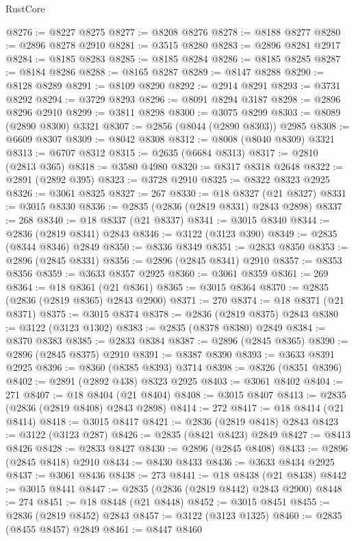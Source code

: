 \begin{lexlean}{RustCore}
\begin{coremodule}
@8276 := @8227 @8275
@8277 := @8208 @8276
@8278 := @8188 @8277
@8280 := @2896 @8278 @2910
@8281 := @3515 @8280
@8283 := @2896 @8281 @2917
@8284 := @8185 @8283
@8285 := @8185 @8284
@8286 := @8185 @8285
@8287 := @8184 @8286
@8288 := @8165 @8287
@8289 := @8147 @8288
@8290 := @8128 @8289
@8291 := @8109 @8290
@8292 := @2914 @8291
@8293 := @3731 @8292
@8294 := @3729 @8293
@8296 := @8091 @8294 @3187
@8298 := @2896 @8296 @2910
@8299 := @3811 @8298
@8300 := @3075 @8299
@8303 := @8089 (@2890 @8300) @3321
@8307 := @2856 (@8044 (@2890 @8303)) @2985
@8308 := @6609 @8307
@8309 := @8042 @8308
@8312 := @8008 (@8040 @8309) @3321
@8313 := @6707 @8312
@8315 := @2635 (@6684 @8313)
@8317 := @2810 (@2813 @365)
@8318 := @3580 @4980
@8320 := @8317 @8318 @2648
@8322 := @2891 (@2892 @395)
@8323 := @3728 @2910
@8325 := @8322 @8323 @2925
@8326 := @3061 @8325
@8327 := 267
@8330 := @18 @8327 (@21 @8327)
@8331 := @3015 @8330
@8336 := @2835 (@2836 (@2819 @8331) @2843 @2898)
@8337 := 268
@8340 := @18 @8337 (@21 @8337)
@8341 := @3015 @8340
@8344 := @2836 (@2819 @8341) @2843
@8346 := @3122 (@3123 @390)
@8349 := @2835 (@8344 @8346) @2849
@8350 := @8336 @8349
@8351 := @2833 @8350
@8353 := @2896 (@2845 @8331)
@8356 := @2896 (@2845 @8341) @2910
@8357 := @8353 @8356
@8359 := @3633 @8357 @2925
@8360 := @3061 @8359
@8361 := 269
@8364 := @18 @8361 (@21 @8361)
@8365 := @3015 @8364
@8370 := @2835 (@2836 (@2819 @8365) @2843 @2900)
@8371 := 270
@8374 := @18 @8371 (@21 @8371)
@8375 := @3015 @8374
@8378 := @2836 (@2819 @8375) @2843
@8380 := @3122 (@3123 @1302)
@8383 := @2835 (@8378 @8380) @2849
@8384 := @8370 @8383
@8385 := @2833 @8384
@8387 := @2896 (@2845 @8365)
@8390 := @2896 (@2845 @8375) @2910
@8391 := @8387 @8390
@8393 := @3633 @8391 @2925
@8396 := @8360 (@8385 @8393) @3714
@8398 := @8326 (@8351 @8396)
@8402 := @2891 (@2892 @438) @8323 @2925
@8403 := @3061 @8402
@8404 := 271
@8407 := @18 @8404 (@21 @8404)
@8408 := @3015 @8407
@8413 := @2835 (@2836 (@2819 @8408) @2843 @2898)
@8414 := 272
@8417 := @18 @8414 (@21 @8414)
@8418 := @3015 @8417
@8421 := @2836 (@2819 @8418) @2843
@8423 := @3122 (@3123 @287)
@8426 := @2835 (@8421 @8423) @2849
@8427 := @8413 @8426
@8428 := @2833 @8427
@8430 := @2896 (@2845 @8408)
@8433 := @2896 (@2845 @8418) @2910
@8434 := @8430 @8433
@8436 := @3633 @8434 @2925
@8437 := @3061 @8436
@8438 := 273
@8441 := @18 @8438 (@21 @8438)
@8442 := @3015 @8441
@8447 := @2835 (@2836 (@2819 @8442) @2843 @2900)
@8448 := 274
@8451 := @18 @8448 (@21 @8448)
@8452 := @3015 @8451
@8455 := @2836 (@2819 @8452) @2843
@8457 := @3122 (@3123 @1325)
@8460 := @2835 (@8455 @8457) @2849
@8461 := @8447 @8460

\end{coremodule}
\end{lexlean}
